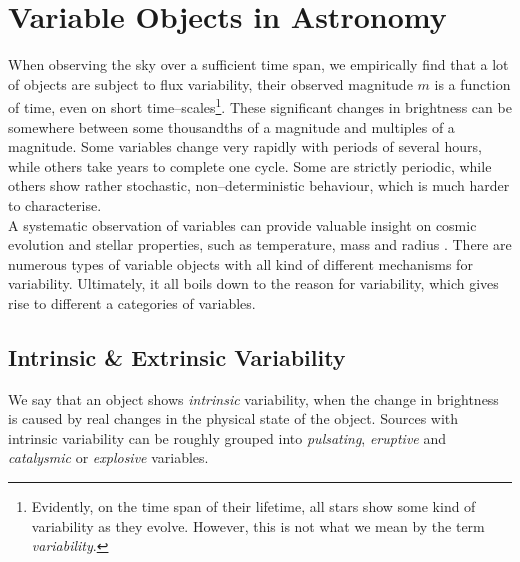 \section{Variable Objects in Astronomy}
\label{sec:theory-variable-objects}


When observing the sky over a sufficient time span, we empirically find that a lot of objects are subject to flux variability, \ie their observed magnitude $m$ is a function of time, even on short time--scales\footnote{Evidently, on the time span of their lifetime, all stars show some kind of variability as they evolve. However, this is not what we mean by the term \emph{variability}.}. These significant changes in brightness can be somewhere between some thousandths of a magnitude and multiples of a magnitude. Some variables change very rapidly with periods of several hours, while others take years to complete one cycle. Some are strictly periodic, while others show  rather stochastic, non--deterministic behaviour, which is much harder to characterise.\\

A systematic observation of variables can provide valuable insight on cosmic evolution and stellar properties, such as temperature, mass and radius \citep{percy2007}. There are numerous types of variable objects with all kind of different mechanisms for variability. Ultimately, it all boils down to the reason for variability, which gives rise to different a categories of variables.


\subsection{Intrinsic \& Extrinsic Variability}

We say that an object shows \emph{intrinsic} variability, when the change in brightness is caused by real changes in the physical state of the object. Sources with intrinsic variability can be roughly grouped into \emph{pulsating}, \emph{eruptive} and \emph{catalysmic} or \emph{explosive} variables.

